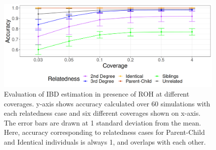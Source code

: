 \documentclass[12pt, letterpaper]{article}
\begin{document}
\begin{figure}[h!]
    \centering
    \includegraphics[width=18cm]{plots/plotimg/plot_IBDaccuracy_roh.png}
    \caption{Evaluation of IBD estimation in presence of ROH at different coverages. y-axis shows accuracy calculated over 60 simulations with each relatedness case and six different coverages shown on x-axis. The error bars are drawn at 1 standard deviation from the mean. Here, accuracy corresponding to relatedness cases for Parent-Child and Identical individuals is always 1, and overlaps with each other.}
    \label{figS11:ibd_asc}
\end{figure}
\end{document}

